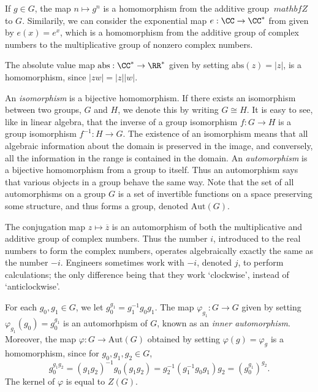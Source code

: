 \begin{example}
    If $g \in G$, the map $n \mapsto g^n$ is a homomorphism from the additive group $\
    mathbf{Z}$ to $G$. Similarily, we can consider the exponential map $e: \CC \to \CC^*$ from given by $e(x) = e^x$, which is a homomorphism from the additive group of complex numbers to the multiplicative group of nonzero complex numbers.
\end{example}

\begin{example}
    The absolute value map $\text{abs}: \CC^* \to \RR^*$ given by setting $\text{abs}(z) = |z|$, is a homomorphism, since $|zw| = |z| |w|$.
\end{example}

An \emph{isomorphism} is a bijective homomorphism. If there exists an isomorphism between two groups, $G$ and $H$, we denote this by writing $G \cong H$. It is easy to see, like in linear algebra, that the inverse of a group isomorphism $f: G \to H$ is a group isomorphism $f^{-1}: H \to G$. The existence of an isomorphism means that all algebraic information about the domain is preserved in the image, and conversely, all the information in the range is contained in the domain. An \emph{automorphism} is a bijective homomorphism from a group to itself. Thus an automorphism says that various objects in a group behave the same way. Note that the set of all automorphisms on a group $G$ is a set of invertible functions on a space preserving some structure, and thus forms a group, denoted $\text{Aut}(G)$.

\begin{example}
    The conjugation map $z \mapsto \overline{z}$ is an automorphism of both the multiplicative and additive group of complex numbers. Thus the number $i$, introduced to the real numbers to form the complex numbers, operates algebraically exactly the same as the number $-i$. Engineers sometimes work with $-i$, denoted $j$, to perform calculations; the only difference being that they work `clockwise', instead of `anticlockwise'.
\end{example}

\begin{example}
    For each $g_0,g_1 \in G$, we let $g_0^{g_1} = g_1^{-1} g_0 g_1$. The map $\varphi_{g_1}: G \to G$ given by setting $\varphi_{g_1}(g_0) = g_0^{g_1}$ is an automorhpism of $G$, known as an \emph{inner automorphism}. Moreover, the map $\varphi: G \to \text{Aut}(G)$ obtained by setting $\varphi(g) = \varphi_g$ is a homomorphism, since for $g_0,g_1,g_2 \in G$,
    \[ g_0^{g_1g_2} = (g_1g_2)^{-1} g_0 (g_1g_2) = g_2^{-1}(g_1^{-1} g_0 g_1) g_2 = (g_0^{g_1})^{g_2}. \]
    The kernel of $\varphi$ is equal to $Z(G)$.
\end{example}


